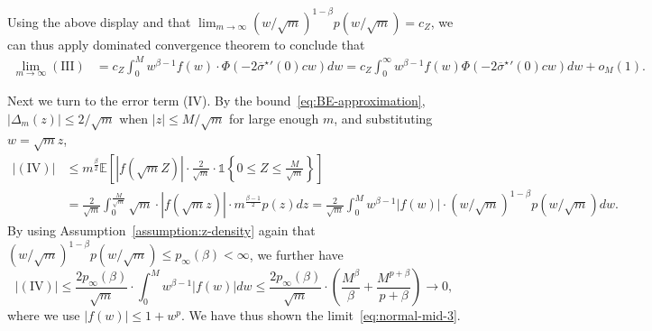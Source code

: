 \documentclass[11pt]{article}
\newcommand{\ind}{\mathds{1}}
\newcommand{\Ep}{\mathbb{E}}
\newcommand{\prn}[1]{\left({#1}\right)} %
\newcommand{\wb}[1]{\overline{#1}}
\newcommand{\<}{\langle} %
\renewcommand{\>}{\rangle}
\newcommand{\opt}{^\star}
\begin{document}
Using the above display and that $\lim_{m \to \infty} (w/\sqrt{m})^{1-\beta}
p(w/\sqrt{m}) = c_Z$, we can thus apply dominated convergence theorem
to conclude that
\begin{align*}
	\lim_{m \to \infty}\mathrm{(III)} 
	&  = c_Z \int_0^M w^{\beta - 1} f(w) \cdot  \Phi  \left( - 2 {\wb{\sigma}\opt}'(0) cw\right) dw = c_Z \int_0^\infty w^{\beta - 1} f(w) \Phi \left( - 2{\wb{\sigma}\opt}'(0) cw \right) dw + o_M(1). %
\end{align*} 

Next we turn to the error term (IV). By the
bound~\eqref{eq:BE-approximation}, $|\Delta_m(z)| \leq 2/\sqrt{m}$ when $|z|
\leq M/\sqrt{m}$ for large enough $m$, and substituting $w = \sqrt{m}z$,
\begin{align*}
	|\mathrm{(IV)}| & \leq m^{\frac{\beta}{2}} \Ep \left[|f(\sqrt m Z)| \cdot \frac{2}{\sqrt m} \cdot \ind\left\{0 \leq Z \leq \frac{M}{\sqrt m}\right\}   \right] \nonumber \\
	& = \frac{2}{\sqrt m} \int_0^{\frac{M}{\sqrt m}} \sqrt m \cdot |f(\sqrt m z)| \cdot m^{\frac{\beta-1}{2}} p(z) dz  = \frac{2}{\sqrt m} \int_0^M w^{\beta - 1}|f(w)| \cdot(w/\sqrt{m})^{1-\beta} p(w/\sqrt{m}) dw.
\end{align*}
By using Assumption~\ref{assumption:z-density} again that $(w/\sqrt{m})^{1-\beta} p(w/\sqrt{m}) \leq p_\infty(\beta) < \infty$, we further have
\begin{equation*}
  |\mathrm{(IV)}| 
  \leq \frac{2p_\infty(\beta) }{\sqrt m} \cdot \int_0^M w^{\beta - 1}|f(w)| dw
  \leq  \frac{2p_\infty(\beta) }{\sqrt m} \cdot
  \prn{\frac{M^\beta}{\beta} +\frac{M^{p+\beta}}{p+\beta}}
  \to 0,
\end{equation*}
where we use $|f(w)| \leq 1+w^p$. We have thus shown the
limit~\eqref{eq:normal-mid-3}.

\end{document}
